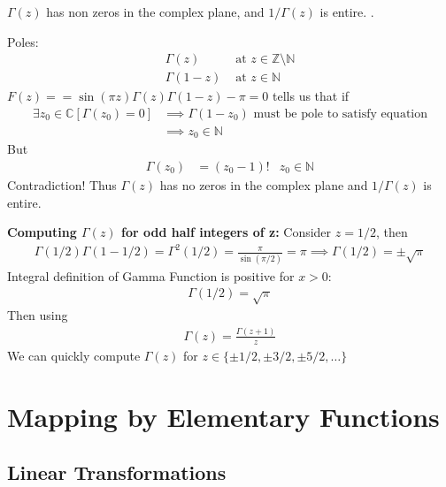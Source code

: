 \documentclass[12pt, english]{book}
\makeatletter
\renewenvironment{proof}[1][\proofname]{\par
	\pushQED{\qed}%
	\normalfont \topsep6\p@\@plus6\p@\relax
	\list{}{%
		\settowidth{\leftmargin}{\itshape\proofname:\hskip\labelsep}%
		\setlength{\labelwidth}{0pt}%
		\setlength{\itemindent}{-\leftmargin}%
	}%
	\item[\hskip\labelsep\itshape#1\@addpunct{:}]\ignorespaces
	}{ \popQED\endlist\@endpefalse}
\makeatother
\begin{document}
	\begin{lemma}
		\label{Gamma Function has no zeros in Complex Plane Lemma - Complex}
		\(\Gamma(z)\) has non zeros in the complex plane, and \(1/\Gamma(z)\) is entire. . 
	\end{lemma}
	\begin{proof}
		Poles:
		\begin{align*}
			\Gamma(z) 	&\text{ at } z \in \mathbb{Z} \setminus \mathbb{N} \\
			\Gamma(1-z) &\text{ at } z \in \mathbb{N}
		\end{align*}
		\(F(z) = = \sin(\pi z) \Gamma(z) \Gamma(1-z) - \pi = 0\) tells us that if
		\begin{align*}
			\exists z_0 \in \mathbb{C} [\Gamma(z_0) = 0] 
			&\implies \Gamma(1-z_0) \text{ must be pole to satisfy equation} \\
			&\implies z_0 \in \mathbb{N}
		\end{align*}
		But
		\begin{align*}
			\Gamma(z_0) &= (z_0 - 1)! & z_0 \in \mathbb{N}
		\end{align*}
		Contradiction! Thus \(\Gamma(z)\) has no zeros in the complex plane and \(1/\Gamma(z)\) is entire.
	\end{proof}

	\textbf{Computing \(\Gamma(z)\) for odd half integers of z:} \newline
	Consider \(z = 1/2\), then
	\begin{align*}
		\Gamma(1/2) \Gamma(1-1/2) = \Gamma^{2}(1/2) = \frac{\pi}{\sin(\pi/2)} = \pi \implies \Gamma(1/2) = \pm \sqrt{\pi}
	\end{align*}
	Integral definition of Gamma Function is positive for \(x > 0\):
	\begin{align*}
		\Gamma(1/2) = \sqrt{\pi}
	\end{align*}
	Then using 
	\begin{align*}
		\Gamma(z) = \frac{\Gamma(z+1)}{z}
	\end{align*}
	We can quickly compute \(\Gamma(z)\) for \(z \in \{\pm 1/2, \pm 3/2, \pm 5/2, \ldots\}\)

	\chapter{Mapping by Elementary Functions} \label{Mapping by Elementary Functions Chapter - Complex}
	
	\section{Linear Transformations} \label{Linear Transformations Section - Complex}
	
\end{document}

